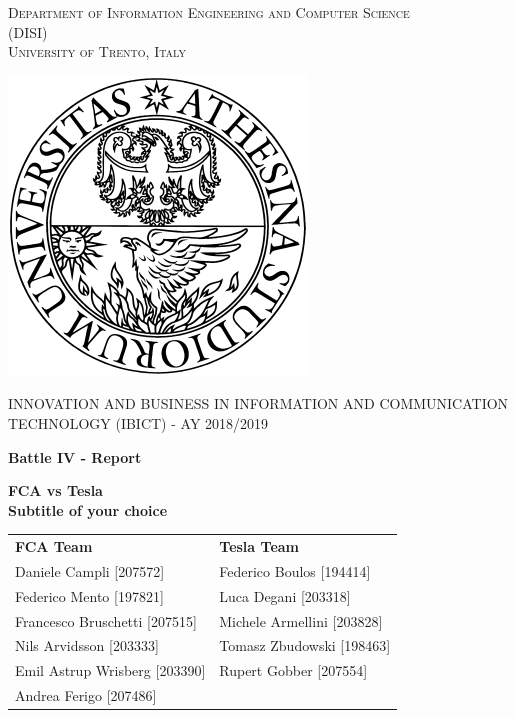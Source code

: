 \begin{titlepage}
	\begin{center}
   	{\scshape\LARGE
    	Department of Information Engineering and Computer Science\\ 
      	(DISI)\\ 
      	University of Trento, Italy\\\par}
      	\vspace{1cm}
      	\includegraphics[scale=0.5]{resources/logo}\\
	\vspace{1cm}
	{\scshape\Large INNOVATION AND BUSINESS IN INFORMATION AND COMMUNICATION TECHNOLOGY (IBICT) - AY 2018/2019\par}
	\vspace{1.5cm}
	{\huge\bfseries Battle IV - Report\\\par}
	\vspace{1cm}
	{\Large\bfseries FCA vs Tesla\\
	Subtitle of your choice\par}
      	\vfill
        \begin{tabular}{ll}
        \textbf{FCA Team}           &       \textbf{Tesla Team}         \\
       	Daniele Campli [207572]     &       Federico Boulos [194414]   \\
	    Federico Mento [197821]     &       Luca Degani [203318]       \\
	    Francesco Bruschetti [207515]       &       Michele Armellini [203828]        \\
	    Nils Arvidsson [203333]        &       Tomasz Zbudowski [198463]      \\
	    Emil Astrup Wrisberg [203390]        &          Rupert Gobber [207554]\\
	    Andrea Ferigo [207486]    \\
        \end{tabular}
      	\vfill
      	\vfill
	\end{center}
\end{titlepage}
